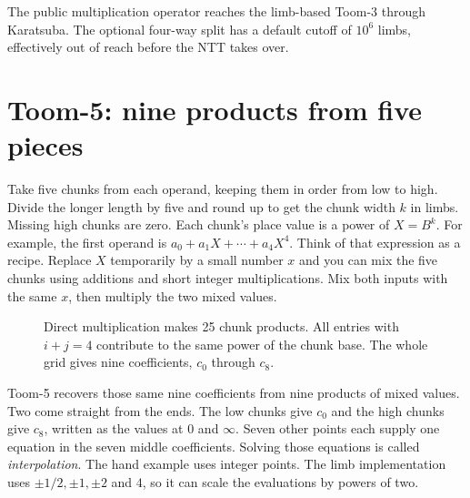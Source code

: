 \begin{practice}
The public multiplication operator reaches the limb-based Toom-3 through
Karatsuba. The optional four-way split has a default cutoff of $10^6$ limbs,
effectively out of reach before the NTT takes over.
\end{practice}

\clearpage
\section{Toom-5: nine products from five pieces}
\label{sec:toomfive}

Take five chunks from each operand, keeping them in order from low to high.
Divide the longer length by five and round up to get the chunk width $k$
in limbs. Missing high chunks are zero. Each chunk's place value is a
power of $X=B^k$.
For example, the first operand is $a_0+a_1X+\cdots+a_4X^4$. Think of
that expression as a recipe. Replace $X$ temporarily by a small number
$x$ and you can mix the five chunks using additions and short integer
multiplications. Mix both inputs with the same $x$, then multiply the
two mixed values.

\begin{figure}[H]
\centering
{}
\caption{Direct multiplication makes 25 chunk products. All entries with
$i+j=4$ contribute to the same power of the chunk base. The whole grid gives
nine coefficients, $c_0$ through $c_8$.}
\end{figure}

Toom-5 recovers those same nine coefficients from nine products of mixed
values. Two come straight from the ends. The low chunks give $c_0$ and
the high chunks give $c_8$, written as the values at $0$ and $\infty$.
Seven other points each supply one equation in the seven middle
coefficients. Solving those equations is called \emph{interpolation}.
The hand example uses integer points. The limb implementation uses
$\pm1/2,\pm1,\pm2$ and $4$, so it can scale the evaluations by powers of two.

